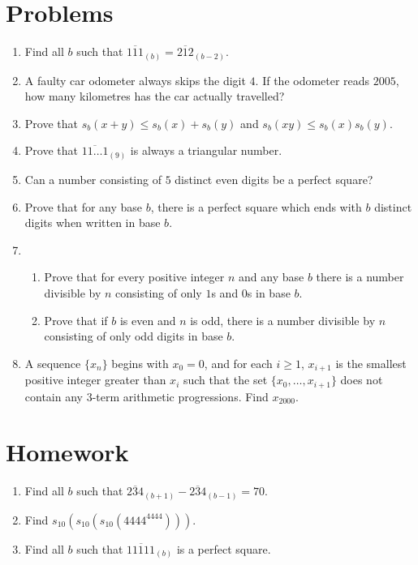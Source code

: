 \documentclass{article}
\begin{document}
\section{Problems}
\begin{enumerate}
	\item Find all $b$ such that $\overline{111}_{(b)}=\overline{212}_{(b-2)}$.
	\item A faulty car odometer always skips the digit $4$. If the odometer
	      reads $2005$, how many kilometres has the car actually travelled?
	\item Prove that $s_b(x+y)\le s_b(x)+s_b(y)$ and $s_b(xy)\le s_b(x)s_b(y)$.
	\item Prove that $\overline{11\ldots1}_{(9)}$ is always a triangular number.
	\item Can a number consisting of $5$ distinct even digits be a perfect
	      square?
	\item Prove that for any base $b$, there is a perfect square which ends with
	      $b$ distinct digits when written in base $b$.
	\item
	      \begin{enumerate}
		      \item Prove that for every positive integer $n$ and any base $b$
		            there is a number divisible by $n$ consisting of only $1$s and $0$s in
		            base $b$.
		      \item Prove that if $b$ is even and $n$ is odd, there is a number divisible by $n$
		            consisting of only odd digits in base $b$.
	      \end{enumerate}
	\item A sequence $\{x_n\}$ begins with $x_0=0$, and for each $i\ge 1$,
	      $x_{i+1}$ is the smallest positive integer greater than $x_i$ such that
	      the set $\{x_0,\ldots,x_{i+1}\}$ does not contain any 3-term arithmetic
	      progressions. Find $x_{2000}$.
\end{enumerate}
\newpage
\section{Homework}
\begin{enumerate}
	\item Find all $b$ such that
	      $\overline{234}_{(b+1)}-\overline{234}_{(b-1)}=70$.
	\item Find $s_{10}(s_{10}(s_{10}(4444^{4444})))$.
	\item Find all $b$ such that $\overline{11111}_{(b)}$ is a perfect square.
\end{enumerate}
\end{document}
